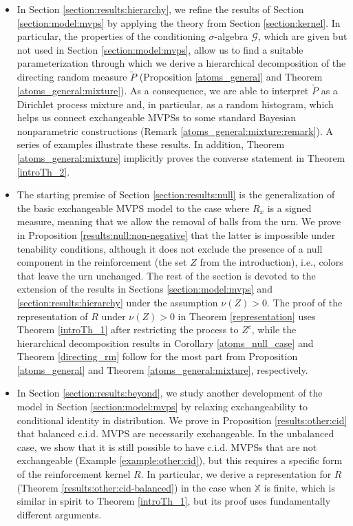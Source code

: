 \documentclass[a4paper]{article}
\theoremstyle{plain}
\theoremstyle{remark}
\theoremstyle{definition}
\begin{document}
\begin{itemize}
\item In Section \ref{section:results:hierarchy}, we refine the results of Section \ref{section:model:mvps} by applying the theory from Section \ref{section:kernel}. In particular, the properties of the conditioning $\sigma$-algebra $\mathcal{G}$, which are given but not used in Section \ref{section:model:mvps}, allow us to find a suitable parameterization through which we derive a hierarchical decomposition of the directing random measure $\tilde{P}$ (Proposition \ref{atoms_general} and Theorem \ref{atoms_general:mixture}). As a consequence, we are able to interpret $\tilde{P}$ as a Dirichlet process mixture and, in particular, as a random histogram, which helps us connect exchangeable MVPSs to some standard Bayesian nonparametric constructions (Remark \ref{atoms_general:mixture:remark}). A series of examples illustrate these results. In addition, Theorem \ref{atoms_general:mixture} implicitly proves the converse statement in Theorem \ref{introTh_2}.\vspace{0.2cm}

\item The starting premise of Section \ref{section:results:null} is the generalization of the basic exchangeable MVPS model to the case where $R_x$ is a signed measure, meaning that we allow the removal of balls from the urn. We prove in Proposition \ref{results:null:non-negative} that the latter is impossible under tenability conditions, although it does not exclude the presence of a null component in the reinforcement (the set $Z$ from the introduction), i.e., colors that leave the urn unchanged. The rest of the section is devoted to the extension of the results in Sections \ref{section:model:mvps} and \ref{section:results:hierarchy} under the assumption $\nu(Z)>0$. The proof of the representation of $R$ under $\nu(Z)>0$ in Theorem \ref{representation} uses Theorem \ref{introTh_1} after restricting the process to $Z^c$, while the hierarchical decomposition results in Corollary \ref{atoms_null_case} and Theorem \ref{directing_rm} follow for the most part from Proposition \ref{atoms_general} and Theorem \ref{atoms_general:mixture}, respectively.\vspace{0.2cm}

\item In Section \ref{section:results:beyond}, we study another development of the model in Section \ref{section:model:mvps} by relaxing exchangeability to conditional identity in distribution. We prove in Proposition \ref{results:other:cid} that balanced c.i.d. MVPS are necessarily exchangeable. In the unbalanced case, we show that it is still possible to have c.i.d. MVPSs that are not exchangeable (Example \ref{example:other:cid}), but this requires a specific form of the reinforcement kernel $R$. In particular, we derive a representation for $R$ (Theorem \ref{results:other:cid-balanced}) in the case when $\mathbb{X}$ is finite, which is similar in spirit to Theorem \ref{introTh_1}, but its proof uses fundamentally different arguments.
\end{itemize}
\end{document}
